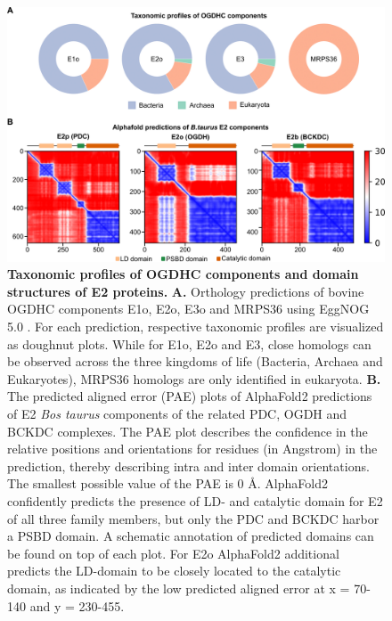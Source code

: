 \begin{subappendices}
\begin{figure}[hbt!]
        \label{fig:ch5_app_fig1}
    \end{figure}

    \begin{figure}[hbt!]
        \center
        \includegraphics[width=\textwidth]{Chapter.5/Figures/Figure_S2.png} 
        \caption{\textbf{Taxonomic profiles of OGDHC components and domain structures of E2 proteins.} \textbf{A.} Orthology predictions of bovine OGDHC components E1o, E2o, E3o and MRPS36 using EggNOG 5.0 \cite{Huerta-Cepas_2019}. For each prediction, respective taxonomic profiles are visualized as doughnut plots. While for E1o, E2o and E3, close homologs can be observed across the three kingdoms of life (Bacteria, Archaea and Eukaryotes), MRPS36 homologs are only identified in eukaryota. \textbf{B.} The predicted aligned error (PAE) plots of AlphaFold2 predictions of E2 \emph{Bos taurus} components of the related PDC, OGDH and BCKDC complexes. The PAE plot describes the confidence in the relative positions and orientations for residues (in Angstrom) in the prediction, thereby describing intra and inter domain orientations. The smallest possible value of the PAE is 0 Å. AlphaFold2 confidently predicts the presence of LD- and catalytic domain for E2 of all three family members, but only the PDC and BCKDC harbor a PSBD domain. A schematic annotation of predicted domains can be found on top of each plot. For E2o AlphaFold2 additional predicts the LD-domain to be closely located to the catalytic domain, as indicated by the low predicted aligned error at x = 70-140 and y = 230-455.}
        \label{fig:ch5_app_fig2}
    \end{figure}


\end{subappendices}
